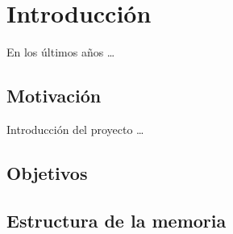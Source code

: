 
\chapter{Introducción}
\label{cha:introduccion}

En los últimos años \ldots

\section{Motivación}
\label{sec:motivacion}

Introducción del proyecto \ldots

\section{Objetivos}
\label{sec:objetivos}

\section{Estructura de la memoria}
\label{sec:estructura-memoria}

